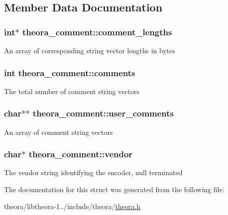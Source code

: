 \subsection{Member Data Documentation}
\hypertarget{structtheora__comment_a5ab4a376d3c217282a684577c9c9f49a}{
\subsubsection[{comment\+\_\+lengths}]{\setlength{\rightskip}{0pt plus 5cm}int$\ast$ theora\+\_\+comment\+::comment\+\_\+lengths}}\label{structtheora__comment_a5ab4a376d3c217282a684577c9c9f49a}
An array of corresponding string vector lengths in bytes \hypertarget{structtheora__comment_a122393035c8352ff9be42d69e73aee00}{
\subsubsection[{comments}]{\setlength{\rightskip}{0pt plus 5cm}int theora\+\_\+comment\+::comments}}\label{structtheora__comment_a122393035c8352ff9be42d69e73aee00}
The total number of comment string vectors \hypertarget{structtheora__comment_a1e236fd180dfce19be89081399444cf5}{
\subsubsection[{user\+\_\+comments}]{\setlength{\rightskip}{0pt plus 5cm}char$\ast$$\ast$ theora\+\_\+comment\+::user\+\_\+comments}}\label{structtheora__comment_a1e236fd180dfce19be89081399444cf5}
An array of comment string vectors \hypertarget{structtheora__comment_adb371baf8f0daed42af8b875cf8430ef}{
\subsubsection[{vendor}]{\setlength{\rightskip}{0pt plus 5cm}char$\ast$ theora\+\_\+comment\+::vendor}}\label{structtheora__comment_adb371baf8f0daed42af8b875cf8430ef}
The vendor string identifying the encoder, null terminated 

The documentation for this struct was generated from the following file\+:\begin{DoxyCompactItemize}
\item 
theora/libtheora-\/1../include/theora/\hyperlink{theora_8h}{theora.\+h}\end{DoxyCompactItemize}
